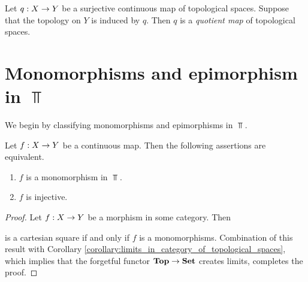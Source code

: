 \begin{definition}
	Let $q:X \rightarrow Y$ be a surjective continuous map of topological spaces. Suppose that the topology on $Y$ is induced by $q$. Then $q$ is a \textit{quotient map} of topological spaces.
\end{definition}

\section{Monomorphisms and epimorphism in $\Top$}
\noindent
We begin by classifying monomorphisms and epimorphisms in $\Top$.

\begin{proposition}\label{proposition:monomorphisms_in_topological_spaces}
	Let $f:X\rightarrow Y$ be a continuous map. Then the following assertions are equivalent.
	\begin{enumerate}[label=\emph{\textbf{(\roman*)}}, leftmargin=3.0em]
		\item $f$ is a monomorphism in $\Top$.
		\item $f$ is injective.
	\end{enumerate}
\end{proposition}
\begin{proof}
	Let $f:X\rightarrow Y$ be a morphism in some category. Then
	\begin{center}
	\end{center}
	is a cartesian square if and only if $f$ is a monomorphisms. Combination of this result with Corollary \ref{corollary:limits_in_category_of_topological_spaces}, which implies that the forgetful functor $\mathbf{Top} \rightarrow \mathbf{Set}$ creates limits, completes the proof.
\end{proof}

